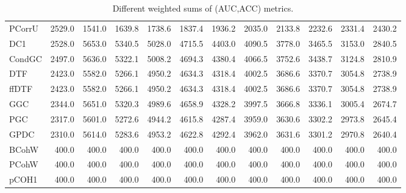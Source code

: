 \begin{table}[ht]
\begin{tabular}{lrrrrrrrrrrr}
  PCorrU & 2529.0 & 1541.0 & 1639.8 & 1738.6 & 1837.4 & 1936.2 & 2035.0 & 2133.8 & 2232.6 & 2331.4 & 2430.2 \\ 
  DC1 & 2528.0 & 5653.0 & 5340.5 & 5028.0 & 4715.5 & 4403.0 & 4090.5 & 3778.0 & 3465.5 & 3153.0 & 2840.5 \\ 
  CondGC & 2497.0 & 5636.0 & 5322.1 & 5008.2 & 4694.3 & 4380.4 & 4066.5 & 3752.6 & 3438.7 & 3124.8 & 2810.9 \\ 
  DTF & 2423.0 & 5582.0 & 5266.1 & 4950.2 & 4634.3 & 4318.4 & 4002.5 & 3686.6 & 3370.7 & 3054.8 & 2738.9 \\ 
  ffDTF & 2423.0 & 5582.0 & 5266.1 & 4950.2 & 4634.3 & 4318.4 & 4002.5 & 3686.6 & 3370.7 & 3054.8 & 2738.9 \\ 
  GGC & 2344.0 & 5651.0 & 5320.3 & 4989.6 & 4658.9 & 4328.2 & 3997.5 & 3666.8 & 3336.1 & 3005.4 & 2674.7 \\ 
  PGC & 2317.0 & 5601.0 & 5272.6 & 4944.2 & 4615.8 & 4287.4 & 3959.0 & 3630.6 & 3302.2 & 2973.8 & 2645.4 \\ 
  GPDC & 2310.0 & 5614.0 & 5283.6 & 4953.2 & 4622.8 & 4292.4 & 3962.0 & 3631.6 & 3301.2 & 2970.8 & 2640.4 \\ 
  BCohW & 400.0 & 400.0 & 400.0 & 400.0 & 400.0 & 400.0 & 400.0 & 400.0 & 400.0 & 400.0 & 400.0 \\ 
  PCohW & 400.0 & 400.0 & 400.0 & 400.0 & 400.0 & 400.0 & 400.0 & 400.0 & 400.0 & 400.0 & 400.0 \\ 
  pCOH1 & 400.0 & 400.0 & 400.0 & 400.0 & 400.0 & 400.0 & 400.0 & 400.0 & 400.0 & 400.0 & 400.0 \\ 
   \hline
\end{tabular}
\caption{Different weighted sums of (AUC,ACC) metrics.} 
\end{table}
